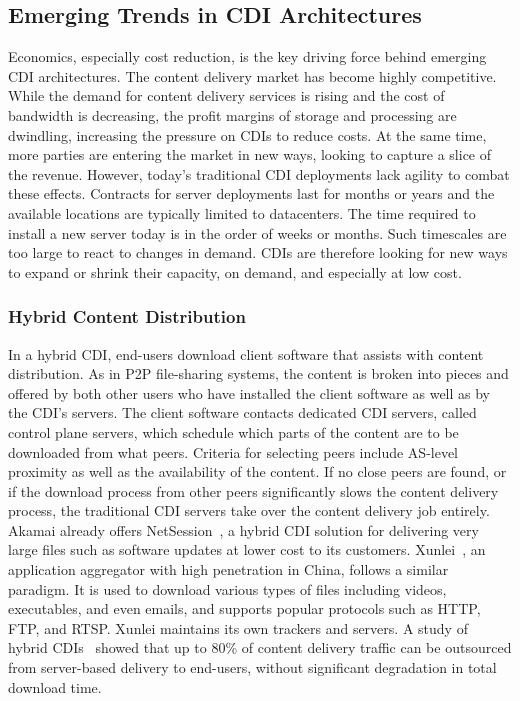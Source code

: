 \subsection{Emerging Trends in CDI Architectures} Economics, especially cost
reduction, is the key driving force behind emerging CDI architectures. The
content delivery market has become highly competitive. While the demand for
content delivery services is rising and the cost of bandwidth is decreasing,
the profit margins of storage and processing \cite{aboveclouds} are dwindling,
increasing the pressure on CDIs to reduce costs. At the same time, more parties
are entering the market in new ways, looking to capture a slice of the revenue.
However, today's traditional CDI deployments lack agility to combat these
effects.  Contracts for server deployments last for months or years and the
available locations are typically limited to datacenters. The time required to
install a new server today is in the order of weeks or months. Such timescales
are too large to react to changes in demand. CDIs are therefore looking for new
ways to expand or shrink their capacity, on demand, and especially at low cost.

\subsubsection{Hybrid Content Distribution} In a hybrid CDI, end-users download
client software that assists with content distribution. As in P2P file-sharing
systems, the content is broken into pieces and offered by both other users who
have installed the client software as well as by the CDI's servers. The client
software contacts dedicated CDI servers, called control plane servers, which
schedule which parts of the content are to be downloaded from what peers.
Criteria for selecting peers include AS-level proximity as well as the
availability of the content. If no close peers are found, or if the download
process from other peers significantly slows the content delivery process, the
traditional CDI servers take over the content delivery job entirely. Akamai
already offers NetSession~\cite{HybridCDN-Bruce}, a hybrid CDI solution for
delivering very large files such as software updates at lower cost to its
customers.  Xunlei~\cite{Xunlei}, an application aggregator with high
penetration in China, follows a similar paradigm.  It is used to download
various types of files including videos, executables, and even emails, and
supports popular protocols such as HTTP, FTP, and RTSP.  Xunlei maintains its
own trackers and servers. A study of hybrid CDIs~\cite{HybridCDN-Ross} showed
that up to 80\% of content delivery traffic can be outsourced from server-based
delivery to end-users, without significant degradation in total download time.

